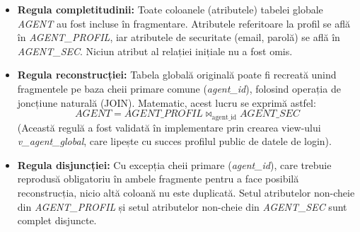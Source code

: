 \begin{itemize}
    \item \textbf{Regula completitudinii:} Toate coloanele (atributele) tabelei globale \textit{AGENT} au fost incluse în fragmentare. Atributele referitoare la profil se află în \textit{AGENT\_PROFIL}, iar atributele de securitate (email, parolă) se află în \textit{AGENT\_SEC}. Niciun atribut al relației inițiale nu a fost omis.
    \item \textbf{Regula reconstrucției:} Tabela globală originală poate fi recreată unind fragmentele pe baza cheii primare comune (\textit{agent\_id}), folosind operația de joncțiune naturală (JOIN). Matematic, acest lucru se exprimă astfel:
    $$AGENT = AGENT\_PROFIL \bowtie_{\text{agent\_id}} AGENT\_SEC$$
    (Această regulă a fost validată în implementare prin crearea view-ului \textit{v\_agent\_global}, care lipește cu succes profilul public de datele de login).
    \item \textbf{Regula disjuncției:} Cu excepția cheii primare (\textit{agent\_id}), care trebuie reprodusă obligatoriu în ambele fragmente pentru a face posibilă reconstrucția, nicio altă coloană nu este duplicată. Setul atributelor non-cheie din \textit{AGENT\_PROFIL} și setul atributelor non-cheie din \textit{AGENT\_SEC} sunt complet disjuncte.
\end{itemize}